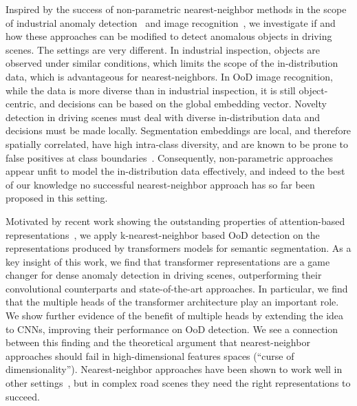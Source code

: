 \documentclass[10pt,twocolumn,letterpaper]{article}
\begin{document}
Inspired by the success of non-parametric nearest-neighbor methods in the scope of industrial anomaly detection~\cite{SPADE, reiss2021panda, patchcore} and image recognition~\cite{sun2022knnood}, we investigate if and how these approaches can be modified to detect anomalous objects in driving scenes. The settings are very different.
In industrial inspection, objects are observed under similar conditions, which limits the scope of the in-distribution data, which is advantageous for nearest-neighbors. 
In OoD image recognition, while the data is more diverse than in industrial inspection, it is still object-centric, and decisions can be based on the global embedding vector.
Novelty detection in driving scenes must deal with diverse in-distribution data and decisions must be made locally. 
Segmentation embeddings are local, and therefore spatially correlated, have high intra-class diversity, and are known to be prone to false positives at class boundaries~\cite{Jung_2021_ICCV}.
Consequently, non-parametric approaches appear unfit to model the in-distribution data effectively, and indeed to the best of our knowledge no successful nearest-neighbor approach has so far been proposed in this setting.

Motivated by recent work showing the outstanding properties of attention-based representations~\cite{caron2021emerging,melas2022deep,zadaianchuk2022unsupervised}, we apply k-nearest-neighbor based OoD detection on the representations produced by transformers models for semantic segmentation.
As a key insight of this work, we find that transformer representations are a game changer for dense anomaly detection in driving scenes, outperforming their convolutional counterparts and state-of-the-art approaches. In particular, we find that the multiple heads of the transformer architecture play an important role. We show further evidence of the benefit of multiple heads by extending the idea to CNNs, improving their performance on OoD detection. We see a connection between this finding and the theoretical argument that nearest-neighbor approaches should fail in high-dimensional features spaces (``curse of dimensionality''). Nearest-neighbor approaches have been shown to work well in other settings~\cite{patchcore, sun2022knnood}, but in complex road scenes they need the right representations to succeed.
\end{document}
